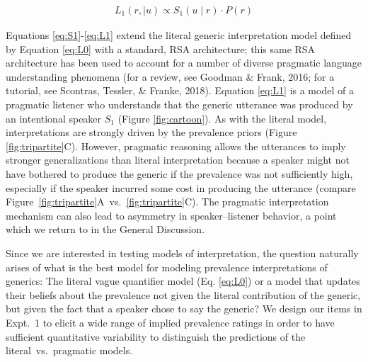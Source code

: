 \documentclass[floatsintext,doc]{apa6}
\begin{document}
\begin{eqnarray}
L_1(r, \mid u) \propto S_1(u \mid r) \cdot P(r) \label{eq:L1}
\end{eqnarray}

Equations \ref{eq:S1}-\ref{eq:L1} extend the literal generic interpretation model defined by Equation \ref{eq:L0} with a standard, RSA architecture; this same RSA architecture has been used to account for a number of diverse pragmatic language understanding phenomena (for a review, see Goodman \& Frank, 2016; for a tutorial, see Scontras, Tessler, \& Franke, 2018).
Equation \ref{eq:L1} is a model of a pragmatic listener who understands that the generic utterance was produced by an intentional speaker \(S_1\) (Figure \ref{fig:cartoon}).
As with the literal model, interpretations are strongly driven by the prevalence priors (Figure \ref{fig:tripartite}C). 
However, pragmatic reasoning allows the utterances to imply stronger generalizations than literal interpretation because a speaker might not have bothered to produce the generic if the prevalence was not sufficiently high, especially if the speaker incurred some cost in producing the utterance (compare Figure~\ref{fig:tripartite}A~vs.~\ref{fig:tripartite}C).
The pragmatic interpretation mechanism can also lead to asymmetry in speaker--listener behavior, a point which we return to in the General Discussion. 


Since we are interested in testing models of interpretation, the question naturally arises of what is the best model for modeling prevalence interpretations of generics: The literal vague quantifier model (Eq. \ref{eq:L0}) or a model that updates their beliefs about the prevalence not given the literal contribution of the generic, but given the fact that a speaker chose to say the generic?
We design our items in Expt.~1 to elicit a wide range of implied prevalence ratings in order to have sufficient quantitative variability to distinguish the predictions of the literal~vs.~pragmatic models.
\end{document}
